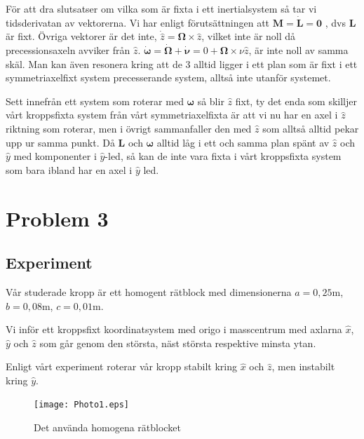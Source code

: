 \documentclass[12pt,a4paper]{article}
\begin{document}
		
		För att dra slutsatser om vilka som är fixta i ett inertialsystem så tar vi tidsderivatan av
		vektorerna. Vi har enligt förutsättningen att $\mathbf{M} = \dot{\mathbf{L}} = \mathbf{0}$ ,
		dvs $\mathbf{L}$ är fixt. Övriga vektorer är det inte, $\dot{\hat{z}}=\boldsymbol{\Omega} \times \hat{z}$,
		vilket inte är noll då precessionsaxeln avviker från $\hat{z}$. $\dot{\boldsymbol{\omega}} = \dot{\boldsymbol{\Omega}}+\dot{\boldsymbol{\nu}} =
		0 + \boldsymbol{\Omega} \times \nu \hat{z}$, är inte noll av samma skäl.
		Man kan även resonera kring att de 3 alltid ligger i ett plan som är fixt i 
		ett symmetriaxelfixt system precesserande system, alltså inte utanför systemet.
		
		Sett innefrån ett system som roterar med $\boldsymbol{\omega}$ så blir $\hat{z}$ fixt, ty det enda som skilljer vårt kroppsfixta system från 
		vårt symmetriaxelfixta är att vi nu har en axel i $\hat{z}$ riktning som roterar, men i övrigt sammanfaller den med $\hat{z}$ som alltså alltid pekar upp ur samma punkt.
		Då $\mathbf{L}$ och $\boldsymbol{\omega}$ alltid låg i ett och samma plan spänt av $\hat{z}$ och $\hat{y}$ med komponenter i $\hat{y}$-led, så kan de inte vara fixta i vårt kroppsfixta system som bara ibland har en axel i $\hat{y}$ led.
		

	
\section{Problem 3}
	
	
	\subsection{Experiment}
		
		Vår studerade kropp är ett homogent rätblock med dimensionerna
		$a = 0,25 \mathrm{m}$, $b = 0,08 \mathrm{m}$, $c = 0,01 \mathrm{m}$.
		
		Vi inför ett kroppsfixt koordinatsystem med origo i masscentrum med axlarna
		$\hat{x}$, $\hat{y}$ och $\hat{z}$ som går genom den största, näst
		största respektive minsta ytan.
		
		Enligt vårt experiment roterar vår kropp stabilt kring $\hat{x}$ och $\hat{z}$, men
		instabilt kring $\hat{y}$.
		
		\begin{figure}
			\begin{center}
				\texttt{[image: Photo1.eps]}
				\caption{Det använda homogena rätblocket}
			\end{center}
		\end{figure}
		
\end{document}
